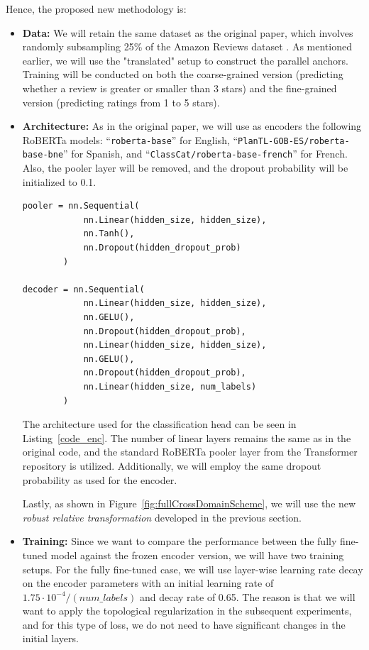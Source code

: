 \documentclass[../main.tex]{subfiles}
\begin{document}
Hence, the proposed new methodology is:
\begin{itemize}
    \item \textbf{Data:}  We will retain the same dataset as the original paper, which involves randomly subsampling 25\% of the Amazon Reviews dataset \cite{keung_multilingual_2020}. As mentioned earlier, we will use the "translated" setup to construct the parallel anchors. Training will be conducted on both the coarse-grained version (predicting whether a review is greater or smaller than 3 stars) and the fine-grained version (predicting ratings from 1 to 5 stars).
    
  
    
    \item \textbf{Architecture:} As in the original paper, we will use as encoders the following RoBERTa \cite{liu_roberta_2019} models: ``\texttt{roberta-base}'' for English, ``\texttt{PlanTL-GOB-ES/roberta-base-bne}'' for Spanish, and ``\texttt{ClassCat/roberta-base-french}'' for French. Also, the pooler layer will be removed, and the dropout probability will be initialized to 0.1.
    \begin{lstlisting}[label=code_enc, caption=Decoder Pytorch class]
pooler = nn.Sequential(
            nn.Linear(hidden_size, hidden_size),
            nn.Tanh(),
            nn.Dropout(hidden_dropout_prob)
        )
        
decoder = nn.Sequential(
            nn.Linear(hidden_size, hidden_size),
            nn.GELU(),
            nn.Dropout(hidden_dropout_prob),
            nn.Linear(hidden_size, hidden_size),
            nn.GELU(),
            nn.Dropout(hidden_dropout_prob),
            nn.Linear(hidden_size, num_labels)
        )
    \end{lstlisting}
    The architecture used for the classification head can be seen in Listing~\ref{code_enc}. The number of linear layers remains the same as in the original code, and the standard RoBERTa pooler layer from the Transformer repository is utilized. Additionally, we will employ the same dropout probability as used for the encoder.

    Lastly, as shown in Figure~\ref{fig:fullCrossDomainScheme}, we will use the new \emph{robust relative transformation} developed in the previous section.

    \item \textbf{Training:} Since we want to compare the performance between the fully fine-tuned model against the frozen encoder version, we will have two training setups. For the fully fine-tuned case, we will use layer-wise learning rate decay on the encoder parameters with an initial learning rate of $1.75\cdot 10^{-4}/(num\_labels)$ and decay rate of 0.65. The reason is that we will want to apply the topological regularization in the subsequent experiments, and for this type of loss, we do not need to have significant changes in the initial layers.
    

\end{itemize}
\end{document}
